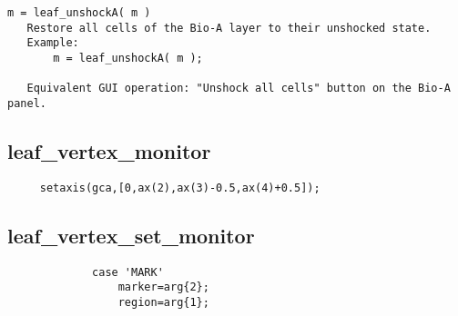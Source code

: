 \begin{verbatim}
m = leaf_unshockA( m )
   Restore all cells of the Bio-A layer to their unshocked state.
   Example:
       m = leaf_unshockA( m );

   Equivalent GUI operation: "Unshock all cells" button on the Bio-A panel.
\end{verbatim}

\subsection{leaf\_vertex\_monitor}\label{section-leaf-vertex-monitor}

\begin{verbatim}
     setaxis(gca,[0,ax(2),ax(3)-0.5,ax(4)+0.5]);
\end{verbatim}

\subsection{leaf\_vertex\_set\_monitor}\label{section-leaf-vertex-set-monitor}

\begin{verbatim}
             case 'MARK'
                 marker=arg{2};
                 region=arg{1};
\end{verbatim}

